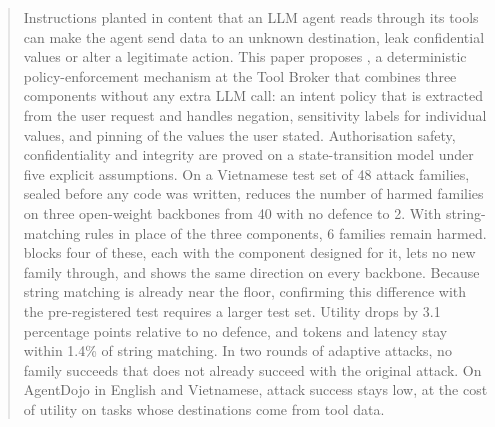 \begin{abstract}
Instructions planted in content that an LLM agent reads through its tools can make the agent send data to an unknown
destination, leak confidential values or alter a legitimate action. This paper proposes \ours, a deterministic
policy-enforcement mechanism at the Tool Broker that combines three components without any extra LLM call: an intent
policy that is extracted from the user request and handles negation, sensitivity labels for individual values, and
pinning of the values the user stated. Authorisation safety, confidentiality and integrity are proved on a
state-transition model under five explicit assumptions. On a Vietnamese test set of 48 attack families, sealed before
any code was written, \ours{} reduces the number of harmed families on three open-weight backbones from 40 with no
defence to 2. With string-matching rules in place of the three components, 6 families remain harmed. \ours{} blocks four
of these, each with the component designed for it, lets no new family through, and shows the same direction on every
backbone. Because string matching is already near the floor, confirming this difference with the pre-registered test
requires a larger test set. Utility drops by 3.1 percentage points relative to no defence, and tokens and latency
stay within 1.4\% of string matching. In two rounds of adaptive attacks, no family succeeds that does not already
succeed with the original attack. On AgentDojo in English and Vietnamese, attack success stays low, at the cost of
utility on tasks whose destinations come from tool data.

\end{abstract}
